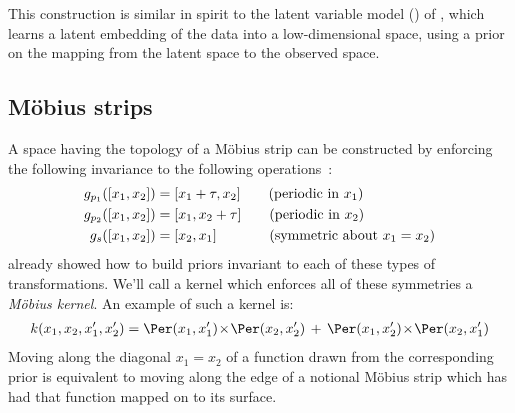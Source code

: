 This construction is similar in spirit to the \gp{} latent variable model (\gplvm{}) of \citet{lawrence2005probabilistic}, which learns a latent embedding of the data into a low-dimensional space, using a \gp{} prior on the mapping from the latent space to the observed space.



\subsection{M\"{o}bius strips}


A space having the topology of a M\"{o}bius strip can be constructed by enforcing the following invariance to the following operations~\citep[chapter 7]{reid2005geometry}:
%
\begin{align}
g_{p_1}([x_1, x_2]) & = [ x_1 + \tau, x_2] \qquad \textnormal{(periodic in $x_1$)} \label{eq:mobius_symmetry_x} \\
g_{p_2}([x_1, x_2]) & = [ x_1, x_2 + \tau] \qquad \textnormal{(periodic in $x_2$)} \label{eq:mobius_symmetry_y} \\
g_s([x_1, x_2]) & = [ x_2, x_1]  \quad \,\,\,\; \qquad \textnormal{(symmetric about $x_1 = x_2$)}
\label{eq:mobius_symmetry_xy}
\end{align}
%
 already showed how to build \gp{} priors invariant to each of these types of transformations.
We'll call a kernel which enforces all of these symmetries a \emph{M\"{o}bius kernel}.
An example of such a kernel is:
%
\begin{align}
k(x_1, x_2, x_1', x_2') = 
\Per(x_1, x_1') \kerntimes \Per(x_2, x_2') \kernplus
\Per(x_1, x_2') \kerntimes \Per(x_2, x_1')
\end{align}
%
Moving along the diagonal $x_1 = x_2$ of a function drawn from the corresponding \gp{} prior is equivalent to moving along the edge of a notional M\"{o}bius strip which has had that function mapped on to its surface.
